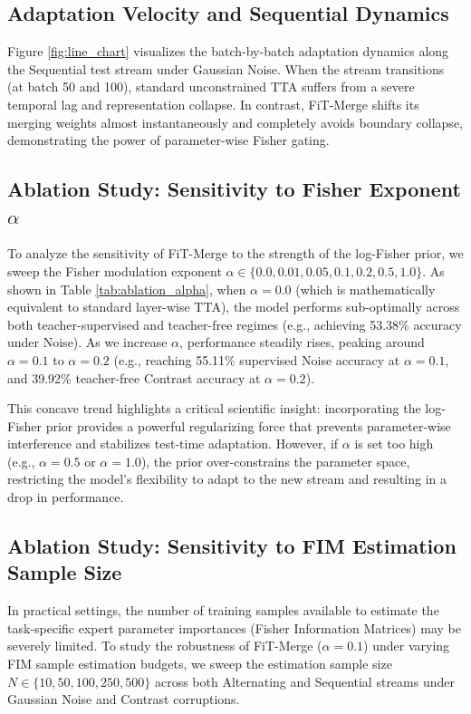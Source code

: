 \documentclass{article}
\theoremstyle{plain}
\theoremstyle{definition}
\theoremstyle{remark}
\begin{document}
\subsection{Adaptation Velocity and Sequential Dynamics}
Figure \ref{fig:line_chart} visualizes the batch-by-batch adaptation dynamics along the Sequential test stream under Gaussian Noise. When the stream transitions (at batch 50 and 100), standard unconstrained TTA suffers from a severe temporal lag and representation collapse. In contrast, FiT-Merge shifts its merging weights almost instantaneously and completely avoids boundary collapse, demonstrating the power of parameter-wise Fisher gating.

\subsection{Ablation Study: Sensitivity to Fisher Exponent $\alpha$}

To analyze the sensitivity of FiT-Merge to the strength of the log-Fisher prior, we sweep the Fisher modulation exponent $\alpha \in \{0.0, 0.01, 0.05, 0.1, 0.2, 0.5, 1.0\}$. As shown in Table \ref{tab:ablation_alpha}, when $\alpha = 0.0$ (which is mathematically equivalent to standard layer-wise TTA), the model performs sub-optimally across both teacher-supervised and teacher-free regimes (e.g., achieving 53.38\% accuracy under Noise). As we increase $\alpha$, performance steadily rises, peaking around $\alpha = 0.1$ to $\alpha = 0.2$ (e.g., reaching 55.11\% supervised Noise accuracy at $\alpha = 0.1$, and 39.92\% teacher-free Contrast accuracy at $\alpha = 0.2$).

This concave trend highlights a critical scientific insight: incorporating the log-Fisher prior provides a powerful regularizing force that prevents parameter-wise interference and stabilizes test-time adaptation. However, if $\alpha$ is set too high (e.g., $\alpha = 0.5$ or $\alpha = 1.0$), the prior over-constrains the parameter space, restricting the model's flexibility to adapt to the new stream and resulting in a drop in performance.

\subsection{Ablation Study: Sensitivity to FIM Estimation Sample Size}

In practical settings, the number of training samples available to estimate the task-specific expert parameter importances (Fisher Information Matrices) may be severely limited. To study the robustness of FiT-Merge ($\alpha = 0.1$) under varying FIM sample estimation budgets, we sweep the estimation sample size $N \in \{10, 50, 100, 250, 500\}$ across both Alternating and Sequential streams under Gaussian Noise and Contrast corruptions.
\end{document}
